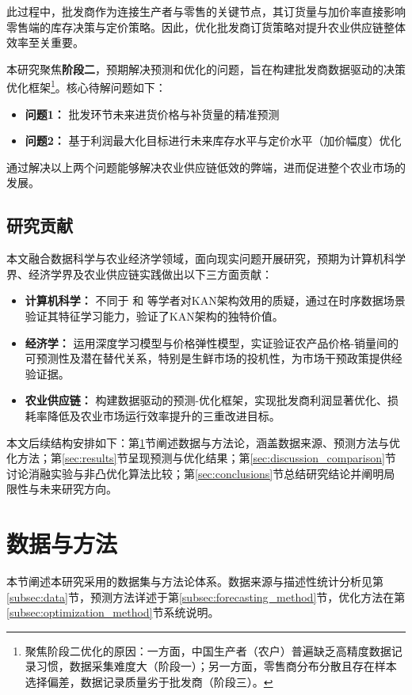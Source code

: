 \documentclass[lang=cn,12pt,a4paper]{elegantpaper}
\begin{document}
此过程中，批发商作为连接生产者与零售的关键节点，其订货量与加价率直接影响零售端的库存决策与定价策略\citep{ke2018coordinating}。因此，优化批发商订货策略对提升农业供应链整体效率至关重要。

本研究聚焦\textbf{阶段二}，预期解决预测和优化的问题，旨在构建批发商数据驱动的决策优化框架\footnote{
聚焦阶段二优化的原因：一方面，中国生产者（农户）普遍缺乏高精度数据记录习惯，数据采集难度大（阶段一）；另一方面，零售商分布分散且存在样本选择偏差，数据记录质量劣于批发商（阶段三）。
}。核心待解问题如下：

\begin{itemize}
  \item \textbf{问题1：} 批发环节未来进货价格与补货量的精准预测
  \item \textbf{问题2：} 基于利润最大化目标进行未来库存水平与定价水平（加价幅度）优化
\end{itemize}
通过解决以上两个问题能够解决农业供应链低效的弊端，进而促进整个农业市场的发展。
\subsection{研究贡献}
\label{subsec:research_contribution}
本文融合数据科学与农业经济学领域，面向现实问题开展研究，预期为计算机科学界、经济学界及农业供应链实践做出以下三方面贡献：

\begin{itemize}
  \item \textbf{计算机科学：} 不同于 \citet{lee2025kolmogorov}和 \citet{shen2025reduced}等学者对KAN架构效用的质疑，通过在时序数据场景验证其特征学习能力，验证了KAN架构的独特价值。
  \item \textbf{经济学：} 运用深度学习模型与价格弹性模型，实证验证农产品价格-销量间的可预测性及潜在替代关系，特别是生鲜市场的投机性，为市场干预政策提供经验证据。
  \item \textbf{农业供应链：} 构建数据驱动的预测-优化框架，实现批发商利润显著优化、损耗率降低及农业市场运行效率提升的三重改进目标。
\end{itemize}

本文后续结构安排如下：第\ref{sec:data_methodology}节阐述数据与方法论，涵盖数据来源、预测方法与优化方法；第\ref{sec:results}节呈现预测与优化结果；第\ref{sec:discussion_comparison}节讨论消融实验与非凸优化算法比较；第\ref{sec:conclusions}节总结研究结论并阐明局限性与未来研究方向。
\section{数据与方法}
\label{sec:data_methodology}
本节阐述本研究采用的数据集与方法论体系。数据来源与描述性统计分析见第\ref{subsec:data}节，预测方法详述于第\ref{subsec:forecasting_method}节，优化方法在第\ref{subsec:optimization_method}节系统说明。
\end{document}
